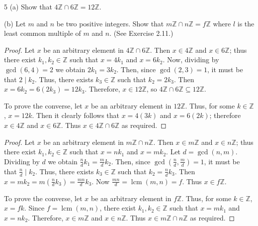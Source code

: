 \begin{problem}{5}
    (a) Show that $4\mathbb{Z} \cap 6\mathbb{Z} = 12\mathbb{Z}$.

    (b) Let $m$ and $n$ be two positive integers. Show that 
        $m\mathbb{Z} \cap n\mathbb{Z} = f\mathbb{Z}$
        where $l$ is the least common multiple of $m$ and $n$.
        (See Exercise 2.11.)
\end{problem}
\solved

\begin{proof}
    Let $x$ be an arbitrary element in $4\mathbb{Z} \cap 6\mathbb{Z}$.
    Then $x \in 4\mathbb{Z}$ and $x \in 6\mathbb{Z}$; thus
        there exist $k_1, k_2 \in \mathbb{Z}$ such that $x = 4 k_1$ and $x = 6 k_2$.
    Now, dividing by $\gcd(6,4) = 2$ we obtain $2 k_1 = 3 k_2$.
    Then, since $\gcd(2,3)=1$, it must be that $2 \mid k_2$.
    Thus, there exists $k_3 \in \mathbb{Z}$ such that $k_2 = 2 k_3$.
    Then $x = 6 k_2 = 6 (2 k_3) = 12 k_3$.
    Therefore, $x \in 12\mathbb{Z}$, so
        $4\mathbb{Z} \cap 6\mathbb{Z} \subseteq 12\mathbb{Z}$.

    To prove the converse, let $x$ be an arbitrary element in $12\mathbb{Z}$.
    Thus, for some $k \in \mathbb{Z}$, $x = 12 k$.
    Then it clearly follows that $x = 4 (3 k)$ and $x = 6 (2 k)$;
        therefore $x \in 4\mathbb{Z}$ and $x \in 6\mathbb{Z}$.
    Thus $x \in 4\mathbb{Z} \cap 6\mathbb{Z}$ as required.
\end{proof}

\begin{proof}
    Let $x$ be an arbitrary element in $m\mathbb{Z} \cap n\mathbb{Z}$.
    Then $x \in m\mathbb{Z}$ and $x \in n\mathbb{Z}$; thus
        there exist $k_1, k_2 \in \mathbb{Z}$ such that
        $x = n k_1$ and $x = m k_2$.
    Let $d = \gcd(n,m)$. Dividing by $d$ we obtain
        $\frac{n}{d} k_1 = \frac{m}{d} k_2$.
    Then, since $\gcd\!\left(\frac{n}{d}, \frac{m}{d}\right) = 1$,
        it must be that $\frac{n}{d} \mid k_2$.
    Thus, there exists $k_3 \in \mathbb{Z}$ such that
        $k_2 = \frac{n}{d} k_3$.
    Then
        $x = m k_2 = m \left(\frac{n}{d} k_3\right)
           = \frac{mn}{d} k_3$.
    Now $\frac{mn}{d} = \operatorname{lcm}(m,n) = f$.
    Thus $x \in f\mathbb{Z}$.

    To prove the converse, let $x$ be an arbitrary element in $f\mathbb{Z}$.
    Thus, for some $k \in \mathbb{Z}$, $x = f k$.
    Since $f = \operatorname{lcm}(m,n)$, there exist $k_1, k_2 \in \mathbb{Z}$
        such that $x = m k_1$ and $x = n k_2$.
    Therefore, $x \in m\mathbb{Z}$ and $x \in n\mathbb{Z}$.
    Thus $x \in m\mathbb{Z} \cap n\mathbb{Z}$ as required.
\end{proof}

